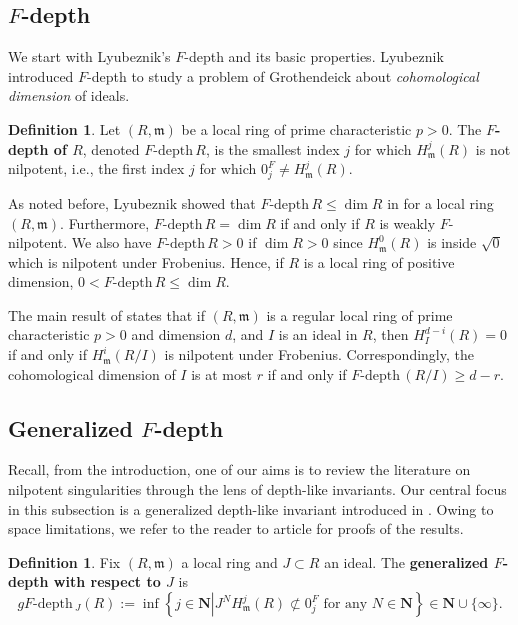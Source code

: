 \documentclass{amsproc}
\theoremstyle{definition}
\newtheorem{definition}[theorem]{Definition}
\theoremstyle{remark}
\numberwithin{equation}{section}
\newcommand{\NN}{\mathbf{N}}
\newcommand{\fm}{\mathfrak{m}}
\newcommand{\fdp}{F\text{-depth}\,}
\newcommand{\gfdp}{gF\text{-depth}\,}
\begin{document}
\subsection{\texorpdfstring{$F$}{F}-depth} We start with Lyubeznik's $F$-depth and its basic properties. Lyubeznik introduced $F$-depth to study a problem of Grothendeick about \textit{cohomological dimension} of ideals. 


\begin{definition}
Let $(R,\fm)$ be a local ring of prime characteristic $p>0$. The \textbf{$F$-depth of $R$}, denoted $\fdp R$, is the smallest index $j$ for which $H^j_\fm(R)$ is not nilpotent, i.e., the first index $j$ for which $0^F_j \neq H^j_\fm(R)$.
\end{definition}

As noted before, Lyubeznik showed that $\fdp R \le \dim R$ in \cite{Lyu06} for a local ring $(R,\fm)$. Furthermore, $\fdp R = \dim R$ if and only if $R$ is weakly $F$-nilpotent. We also have $\fdp R > 0$ if $\dim R>0$ since $H^0_\fm(R)$ is inside $\sqrt{0}$ which is nilpotent under Frobenius. Hence, if $R$ is a local ring of positive dimension, $0 < \fdp R \le \dim R$. 

The main result of \cite{Lyu06} states that if $(R,\fm)$ is a regular local ring of prime characteristic $p>0$ and dimension $d$, and $I$ is an ideal in $R$, then $H^{d-i}_I(R) = 0$ if and only if $H^i_\fm(R/I)$ is nilpotent under Frobenius. Correspondingly, the cohomological dimension of $I$ is at most $r$ if and only if $\fdp(R/I) \ge d-r$. 


\subsection{Generalized \texorpdfstring{$F$}{F}-depth}\label{sec:genfdepth} Recall, from the introduction, one of our aims is to review the literature on nilpotent singularities through the lens of depth-like invariants. Our central focus in this subsection is a generalized depth-like invariant introduced in \cite{CMM23}. Owing to space limitations, we refer to the reader to article for proofs of the results. 


\begin{definition}
Fix $(R,\fm)$ a local ring and $J \subset R$ an ideal. The {\bf generalized $F$-depth with respect to $J$} is 
\[\gfdp_J(R) := \inf \left\lbrace j \in \NN \left| J^N H_\fm^j(R) \not \subset 0^F_j \text{ for any } N \in \NN \right\rbrace \in \NN \cup \{ \infty \right. \}.\]
\end{definition}
\end{document}
